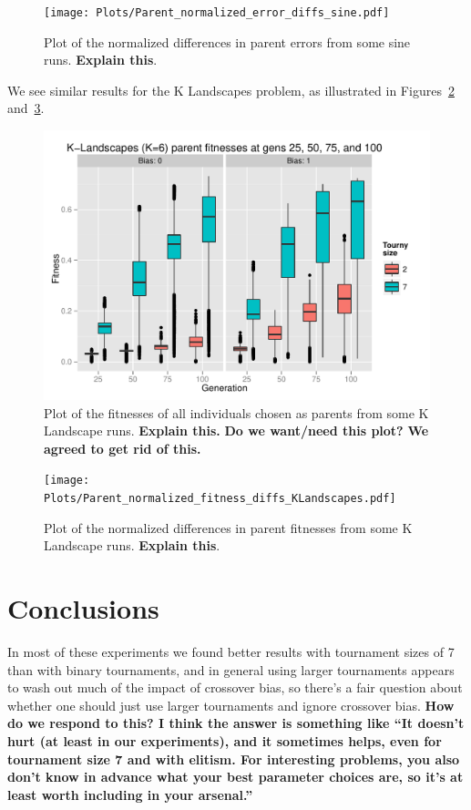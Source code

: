 \documentclass{sig-alternate}
\begin{document}
\begin{figure}
\centering
\texttt{[image: Plots/Parent\_normalized\_error\_diffs\_sine.pdf]}
\caption{Plot of the normalized differences in parent errors from some sine runs. \textbf{Explain this}.}
\label{fig:parentDiffsSine}
\end{figure}

We see similar results for the K Landscapes problem, as illustrated in Figures~\ref{fig:parentFitnessesKLandscapes}
and~\ref{fig:parentDiffsKLandscapes}.

\begin{figure}
\centering
\includegraphics[width=0.45 \textwidth]{Plots/Parent_fitnesses_KLandscapes.pdf}
\caption{Plot of the fitnesses of all individuals chosen as parents from some K Landscape runs. \textbf{Explain this.}
\textbf{Do we want/need this plot?} \textbf{We agreed to get rid of this.}}
\label{fig:parentFitnessesKLandscapes}
\end{figure}

\begin{figure}
\centering
\texttt{[image: Plots/Parent\_normalized\_fitness\_diffs\_KLandscapes.pdf]}
\caption{Plot of the normalized differences in parent fitnesses from some K Landscape runs. \textbf{Explain this}.}
\label{fig:parentDiffsKLandscapes}
\end{figure}

\section{Conclusions} \label{sec:Conclusions}

In most of these experiments we found better results with tournament sizes of 7 than with binary tournaments, and in 
general using larger tournaments appears to wash out much of the impact of crossover bias, so there's a fair question 
about whether one should just use larger tournaments and ignore crossover bias. \textbf{How do we respond to this? I 
think the answer is something like ``It doesn't hurt (at least in our experiments), and it sometimes helps, even for 
tournament size 7 and with elitism. For interesting problems, you also don't know in advance what your best parameter 
choices are, so it's at least worth including in your arsenal.''}
\end{document}
